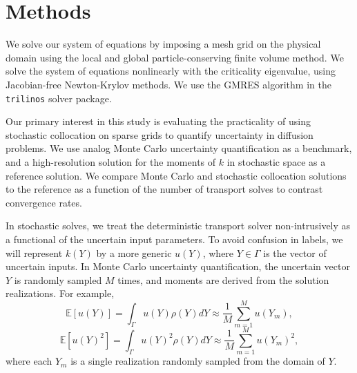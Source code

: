 \documentclass{anstrans}
\newcommand{\expv}[1]{\ensuremath{\mathbb{E}[ #1]}}
\begin{document}
\section{Methods}
We solve our system of equations by imposing a mesh grid on the physical domain using the local and global particle-conserving finite volume method.  We solve the system of equations nonlinearly with the criticality eigenvalue, using Jacobian-free Newton-Krylov methods.  We use the GMRES algorithm in the \texttt{trilinos} solver package.%

Our primary interest in this study is evaluating the practicality of using stochastic collocation on sparse grids \cite{sparse1}\cite{sparse2}\cite{sparseSC} to quantify uncertainty in diffusion problems. We use analog Monte Carlo uncertainty quantification as a benchmark, and a high-resolution solution for the moments of $k$ in stochastic space as a reference solution. We compare Monte Carlo and stochastic collocation solutions to the reference as a function of the number of transport solves to contrast convergence rates. 

In stochastic solves, we treat the deterministic transport solver non-intrusively as a functional of the uncertain input parameters.  To avoid confusion in labels, we will represent $k(Y)$ by a more generic $u(Y)$, where $Y\in\Gamma$ is the vector of uncertain inputs.
In Monte Carlo uncertainty quantification, the uncertain vector $Y$ is randomly sampled $M$ times, and moments are derived from the solution realizations.  For example, 
\begin{equation}
\expv{u(Y)} = \int_\Gamma u(Y) \rho(Y) dY\approx \frac{1}{M}\sum_{m=1}^M u(Y_m),
\end{equation}
\begin{equation}
\expv{u(Y)^2} = \int_\Gamma u(Y)^2 \rho(Y) dY\approx \frac{1}{M}\sum_{m=1}^M u(Y_m)^2,
\end{equation}
where each $Y_m$ is a single realization randomly sampled from the domain of $Y$.
\end{document}
